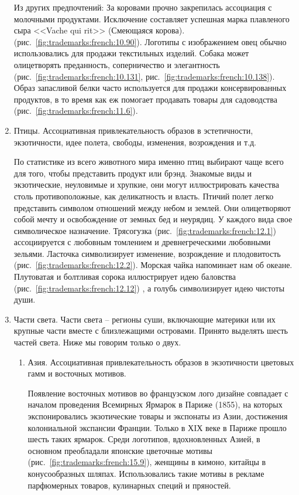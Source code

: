 \begin{enumerate}
  Из других предпочтений: За коровами прочно закрепилась ассоциация с молочными
  продуктами. Исключение составляет успешная марка плавленого сыра <<Vache qui
  rit>> (Смеющаяся корова). (рис.~\ref{fig:trademarks:french:10.90}). Логотипы с
  изображением овец обычно использовались для продажи текстильных изделий. Собака
  может олицетворять преданность, соперничество и элегантность
  (рис.~\ref{fig:trademarks:french:10.131},
  рис.~\ref{fig:trademarks:french:10.138}).  Образ запасливой белки часто
  используется для продажи консервированных продуктов, в то время как еж помогает
  продавать товары для садоводства (рис.~\ref{fig:trademarks:french:11.6}).
\item Птицы. Ассоциативная привлекательность образов в эстетичности,
  экзотичности, идее полета, свободы, изменения, возрождения и т.д.

  По статистике из всего животного мира именно птиц выбирают чаще всего для
  того, чтобы представить продукт или брэнд. Знакомые виды и экзотические,
  неуловимые и хрупкие, они могут иллюстрировать качества столь противоположные,
  как деликатность и власть. Птичий полет легко представить символом отношений
  между небом и землей. Они олицетворяют собой мечту и освобождение от земных бед
  и неурядиц. У каждого вида свое символическое назначение.  Трясогузка
  (рис.~\ref{fig:trademarks:french:12.1}) ассоциируется с любовным томлением и
  древнегреческими любовными зельями. Ласточка символизирует изменение,
  возрождение и плодовитость (рис.~\ref{fig:trademarks:french:12.2}). Морская
  чайка напоминает нам об океане. Плутоватая и болтливая сорока иллюстрирует идею
  баловства (рис.~\ref{fig:trademarks:french:12.12}) , а голубь символизирует идею
  чистоты души.
\item Части света. Части света -- регионы суши, включающие материки или их
  крупные части вместе с близлежащими островами. Принято выделять шесть частей
  света. Ниже мы говорим только о двух.
  \begin{enumerate}
  \item Азия. Ассоциативная привлекательность образов в экзотичности цветовых
    гамм и восточных мотивов.

    Появление восточных мотивов во французском лого дизайне совпадает с началом
    проведения Всемирных Ярмарок в Париже (1855), на которых экспонировались
    экзотические товары и экспонаты из Азии, достижения колониальной экспансии
    Франции. Только в ХIХ веке в Париже прошло шесть таких ярмарок. Среди логотипов,
    вдохновленных Азией, в основном преобладали японские цветочные мотивы
    (рис.~\ref{fig:trademarks:french:15.9}), женщины в кимоно, китайцы в
    конусообразных шляпах.  Использовались такие мотивы в рекламе парфюмерных
    товаров, кулинарных специй и пряностей. %


\end{enumerate}
\end{enumerate}
